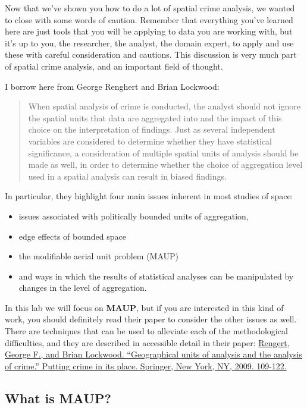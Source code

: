 \documentclass[]{book}
\providecommand{\tightlist}{%
  \setlength{\itemsep}{0pt}\setlength{\parskip}{0pt}}
\begin{document}
Now that we've shown you how to do a lot of spatial crime analysis, we wanted to close with some words of caution. Remember that everything you've learned here are just tools that you will be applying to data you are working with, but it's up to you, the researcher, the analyst, the domain expert, to apply and use these with careful consideration and cautions. This discussion is very much part of spatial crime analysis, and an important field of thought.

I borrow here from George Renghert and Brian Lockwood:

\begin{quote}
When spatial analysis of crime is conducted, the analyst should not ignore the spatial units that data are aggregated into and the impact of this choice on the interpretation of findings. Just as several independent variables are considered to determine whether they have statistical significance, a consideration of multiple spatial units of analysis should be made as well, in order to determine whether the choice of aggregation level used in a spatial analysis can result in biased findings.
\end{quote}

In particular, they highlight four main issues inherent in most studies of space:

\begin{itemize}
\tightlist
\item
  issues associated with politically bounded units of aggregation,
\item
  edge effects of bounded space
\item
  the modifiable aerial unit problem (MAUP)
\item
  and ways in which the results of statistical analyses can be manipulated by changes in the level of
  aggregation.
\end{itemize}

In this lab we will focus on \textbf{MAUP}, but if you are interested in this kind of work, you should definitely read their paper to consider the other issues as well. There are techniques that can be used to alleviate each of the methodological difficulties, and they are described in accessible detail in their paper: \href{https://link.springer.com/chapter/10.1007/978-0-387-09688-9_5}{Rengert, George F., and Brian Lockwood. ``Geographical units of analysis and the analysis of crime.'' Putting crime in its place. Springer, New York, NY, 2009. 109-122.}

\hypertarget{what-is-maup}{%
\subsection{What is MAUP?}\label{what-is-maup}}
\end{document}

